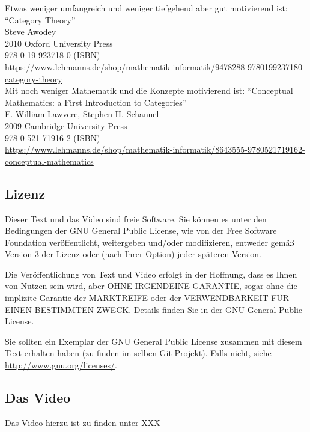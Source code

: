\documentclass[a4paper]{amsart}
\theoremstyle{definition}
\begin{document}
Etwas weniger umfangreich und weniger tiefgehend aber gut motivierend ist:
"`Category Theory"'\\
Steve Awodey\\
2010 Oxford University Press\\
978-0-19-923718-0 (ISBN)\\
{\tiny\url{https://www.lehmanns.de/shop/mathematik-informatik/9478288-9780199237180-category-theory}}\\

Mit noch weniger Mathematik und die Konzepte motivierend ist:
"`Conceptual Mathematics: a First Introduction to Categories"'\\
F. William Lawvere, Stephen H. Schanuel\\
2009 Cambridge University Press\\
978-0-521-71916-2 (ISBN)\\
{\tiny\url{https://www.lehmanns.de/shop/mathematik-informatik/8643555-9780521719162-conceptual-mathematics}}

\subsection*{Lizenz}
Dieser Text und das Video sind freie Software. Sie können es unter den Bedingungen der
GNU General Public License, wie von der Free Software Foundation veröffentlicht, weitergeben
und/oder modifizieren, entweder gemäß Version 3 der Lizenz oder (nach Ihrer Option) jeder späteren Version.

Die Veröffentlichung von Text und Video erfolgt in der Hoffnung, dass es Ihnen von Nutzen sein wird,
aber OHNE IRGENDEINE GARANTIE, sogar ohne die implizite Garantie der MARKTREIFE oder der
VERWENDBARKEIT FÜR EINEN BESTIMMTEN ZWECK. Details finden Sie in der GNU General Public License.

Sie sollten ein Exemplar der GNU General Public License zusammen mit diesem Text erhalten haben
(zu finden im selben Git-Projekt).
Falls nicht, siehe \url{http://www.gnu.org/licenses/}.

\subsection*{Das Video}
Das Video hierzu ist zu finden unter
{\tiny
   \url{XXX}
}
\end{document}
